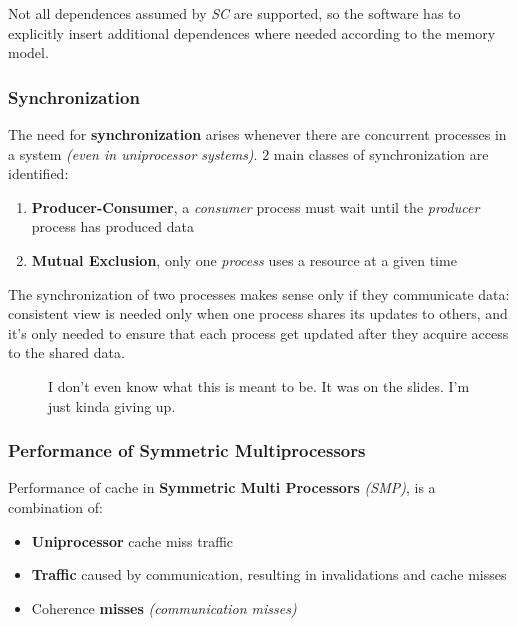 \documentclass[english]{article}
\begin{document}
\bigskip
Not all dependences assumed by \textit{SC} are supported, so the software has to explicitly insert additional dependences where needed according to the memory model.

\subsubsection{Synchronization}

The need for \textbf{synchronization} arises whenever there are concurrent processes in a system \textit{(even in uniprocessor systems)}.
\(2\) main classes of synchronization are identified:

\begin{enumerate}
  \item \textbf{Producer-Consumer}, a \textit{consumer} process must wait until the \textit{producer} process has produced data
  \item \textbf{Mutual Exclusion}, only one \textit{process} uses a resource at a given time
\end{enumerate}

\bigskip
The synchronization of two processes makes sense only if they communicate data: consistent view is needed only when one process shares its updates to others, and it's only needed to ensure that each process get updated after they acquire access to the shared data.

\begin{figure}[htbp]
  \bigskip
  \centering
  \caption{I don't even know what this is meant to be. It was on the slides. I'm just kinda giving up.}
  \label{fig:i-dont-know}
  \bigskip
\end{figure}

\subsubsection{Performance of Symmetric Multiprocessors}

Performance of cache in \textbf{Symmetric Multi Processors} \textit{(SMP)}, is a combination of:

\begin{itemize}
  \item \textbf{Uniprocessor} cache miss traffic
  \item \textbf{Traffic} caused by communication, resulting in invalidations and cache misses
  \item Coherence \textbf{misses} \textit{(communication misses)}
\end{itemize}
\end{document}

